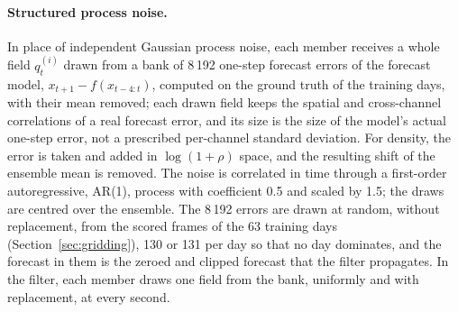 \documentclass[english, 12pt, a4paper, elec, utf8, a-2b, online]{aaltothesis}
\begin{document}
\paragraph{Structured process noise.}
In place of independent Gaussian process noise, each member receives a whole
field $q^{(i)}_t$ drawn from a bank of 8\,192 one-step forecast errors of the
forecast model, $x_{t+1} - f(x_{t-4:t})$, computed on the ground truth of the
training days, with their mean removed; each drawn field keeps the spatial and
cross-channel correlations of a real forecast error, and its size is the size
of the model's actual one-step error, not a prescribed per-channel standard
deviation. For density, the error is taken and
added in $\log(1+\rho)$ space, and the resulting shift of the ensemble mean is
removed. The noise is correlated in time through a first-order autoregressive, AR(1), process with
coefficient 0.5 and scaled by 1.5; the draws are centred over the ensemble.
The 8\,192 errors are drawn at random, without replacement, from the scored
frames of the 63 training days (Section~\ref{sec:gridding}), 130 or 131 per day
so that no day dominates, and the forecast in them is the zeroed and clipped
forecast that the filter propagates. In the filter, each member draws one field
from the bank, uniformly and with replacement, at every second.
\end{document}
